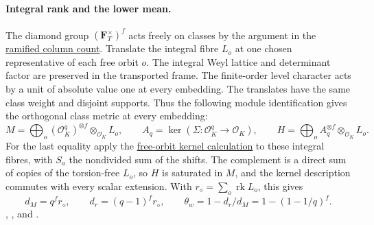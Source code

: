 \paragraph{Integral rank and the lower mean.}
\leavevmode{}%
The diamond group \((\mathbf F_T^\times)^f\) acts freely on
classes by the argument in the
\hyperlink{proof.ramified-column-loss}{ramified column count}.
Translate the integral fibre \(L_o\) at one chosen representative
of each free orbit \(o\). The integral Weyl lattice and determinant
factor are preserved in the transported frame. The finite-order
level character acts by a unit of absolute value one at every
embedding. The translates have the same class weight and
disjoint supports. Thus the following module identification
gives the orthogonal class metric at every embedding:
\[
 M=\bigoplus_o(\mathcal O_K^q)^{\otimes f}\otimes_{\mathcal O_K} L_o,\qquad
 A_q=\ker(\Sigma:\mathcal O_K^q\to\mathcal O_K),\qquad
 H=\bigoplus_o A_q^{\otimes f}\otimes_{\mathcal O_K} L_o .
\]
For the last equality apply the
\hyperlink{proof.diamond-augmentation-kernels}{free-orbit kernel calculation}
to these integral fibres, with \(S_a\) the nondivided sum of
the shifts. The complement is a direct sum of copies of the
torsion-free \(L_o\), so \(H\) is saturated in \(M\), and the
kernel description commutes with every scalar extension. With
\(r_\diamond=\sum_o\operatorname{rk}L_o\), this gives
\begin{equation}
\label{eq:selected-ramified-rank}
 d_M=q^f r_\diamond,\qquad d_r=(q-1)^f r_\diamond,\qquad
 \theta_w=1-d_r/d_M=1-(1-1/q)^f .
\end{equation}
,
,
 and
.

